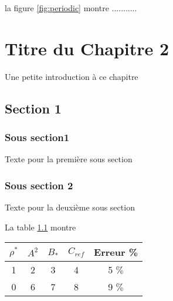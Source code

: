 \documentclass{DChibouti}
\begin{document}
la figure \ref{fig:periodic} montre ........... 

\chapter{Titre du Chapitre 2}
Une petite introduction à ce chapitre
\section{Section 1}

\subsection{Sous section1}

Texte pour la première sous section


\subsection{Sous section 2}
Texte pour la deuxième sous section

La table \ref{tab:tableau1} montre 
 \begin{table}[htbp]
	\centering
	{\small {\begin{tabular}{|ccccc|}
		\hline
		$\rho ^*$ & $A^2$  & $B_{*}$  & $C_{ref}$ & Erreur \% \\
		\hline
	    1
		& 2
		& 3
		& 4 
		& 5 $\%$\\
		0 
		& 6
		& 7
		& 8
		& 9 $\%$ \\
		\hline
		
		\end{tabular}}}
    \label{tab:tableau1}
 \end{table}
\end{document}
